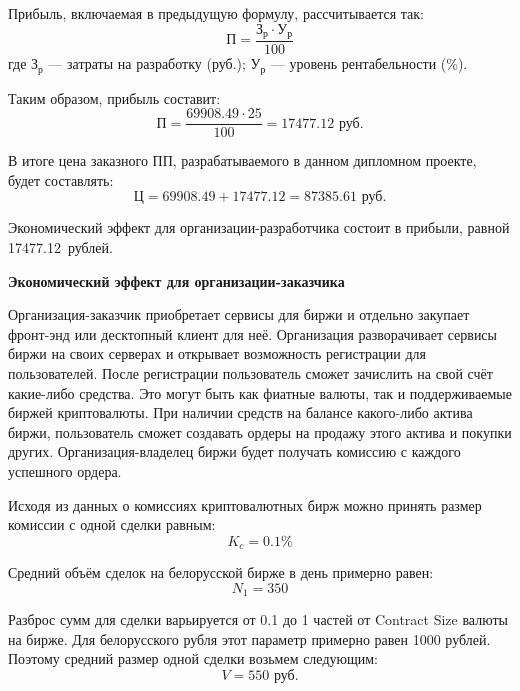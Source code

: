 Прибыль, включаемая в предыдущую формулу, рассчитывается так:
\begin{equation}
    \textit{П} = \frac{\textit{З}_\textit{р} \cdot \textit{У}_\textit{р}}{100}
\end{equation}
где $\textit{З}_\textit{р}$ — затраты на разработку (руб.); $\textit{У}_\textit{р}$ — уровень рентабельности (\%).

Таким образом, прибыль составит:
\begin{equation}
    \textit{П} = \frac{69908.49 \cdot 25}{100} = 17477.12 \textrm{ руб.}
\end{equation}

В итоге цена заказного ПП, разрабатываемого в данном дипломном проекте, будет составлять:
\begin{equation}
    \textit{Ц} = 69908.49 + 17477.12 = 87385.61 \textrm{ руб.}
\end{equation}

Экономический эффект для организации-разработчика состоит в прибыли, равной 17477.12~рублей.

\textbf{Экономический эффект для организации-заказчика}

Организация-заказчик приобретает сервисы для биржи и отдельно закупает фронт-энд или десктопный клиент для неё. Организация разворачивает сервисы биржи на своих серверах и открывает возможность регистрации для пользователей. После регистрации пользователь сможет зачислить на свой счёт какие-либо средства. Это могут быть как фиатные валюты, так и поддерживаемые биржей криптовалюты. При наличии средств на балансе какого-либо актива биржи, пользователь сможет создавать ордеры на продажу этого актива и покупки других. Организация-владелец биржи будет получать комиссию с каждого успешного ордера.

Исходя из данных о комиссиях криптовалютных бирж можно принять размер комиссии с одной сделки равным:
\begin{equation}
    K_c = 0.1 \%
\end{equation}

Средний объём сделок на белорусской бирже в день примерно равен:
\begin{equation}
    N_1 = 350
\end{equation}

Разброс сумм для сделки варьируется от 0.1 до 1 частей от Contract Size валюты на бирже. Для белорусского рубля этот параметр примерно равен 1000 рублей. Поэтому средний размер одной сделки возьмем следующим:
\begin{equation}
     V = 550 \textrm{ руб.}
\end{equation}

